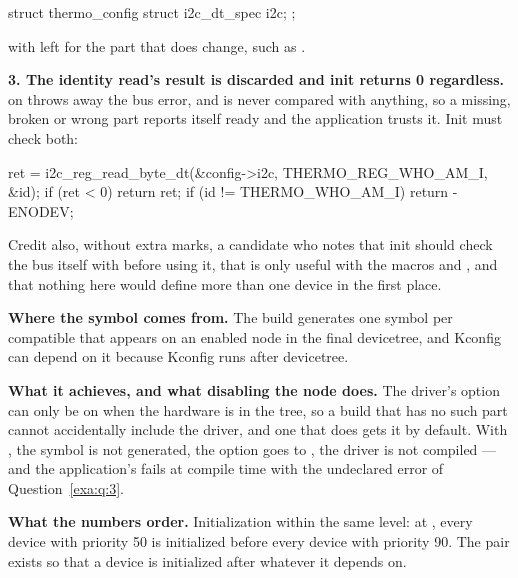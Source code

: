 \begin{ccode}
struct thermo_config {
	struct i2c_dt_spec i2c;
};
\end{ccode}

\noindent with  left for the part that does change, such as .

\textbf{3. The identity read's result is discarded and init returns 0 regardless.}  on
 throws away the bus error, and  is never compared with
anything, so a missing, broken or wrong part reports itself ready and the application trusts it.
Init must check both:

\begin{ccode}
ret = i2c_reg_read_byte_dt(&config->i2c, THERMO_REG_WHO_AM_I, &id);
if (ret < 0) {
	return ret;
}
if (id != THERMO_WHO_AM_I) {
	return -ENODEV;
}
\end{ccode}

Credit also, without extra marks, a candidate who notes that init should check the bus itself with
 before using it, that  is only useful with
the  macros and , and that nothing here would
define more than one device in the first place.

\textbf{Where the symbol comes from.} The build generates one 
symbol per compatible that appears on an enabled node in the final devicetree, and Kconfig can
depend on it because Kconfig runs after devicetree. 

\textbf{What it achieves, and what disabling the node does.} The driver's option can only be on when
the hardware is in the tree, so a build that has no such part cannot accidentally include the
driver, and one that does gets it by default. With , the symbol is not
generated, the option goes to , the driver is not compiled --- and the application's
 fails at compile time with the  undeclared error of
Question~\ref{exa:q:3}. 

\textbf{What the numbers order.} Initialization within the same level: at , every
device with priority 50 is initialized before every device with priority 90. The pair exists so that
a device is initialized after whatever it depends on. 


